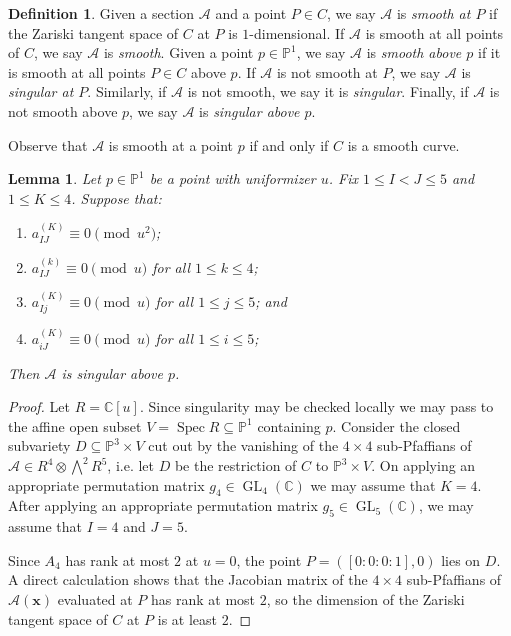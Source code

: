 \documentclass[11pt]{amsart}
\numberwithin{theorem}{section}
\numberwithin{equation}{section}
\newtheorem{lemma}[theorem]{Lemma}
\theoremstyle{definition}\newtheorem{defn}[theorem]{Definition}
\theoremstyle{definition}\newtheorem{remark}[theorem]{Remark}
\theoremstyle{definition}\newtheorem{question}[theorem]{Question}
\theoremstyle{definition}\newtheorem{problem}[theorem]{Problem}
\newcommand{\CC}{\mathbb{C}}
\newcommand{\PP}{\mathbb{P}}
\newcommand{\cA}{\mathcal{A}}
\DeclareMathOperator{\Spec}{Spec}
\DeclareMathOperator{\GL}{GL}
\renewcommand{\subset}{\subseteq}
\newcommand{\I}{I}
\newcommand{\J}{J}
\newcommand{\K}{K}
\begin{document}
\begin{defn}
\label{smooth-defn}
Given a section $\cA$ and a point $P \in C$, we say $\cA$ is \emph{smooth at $P$} if the Zariski tangent space of $C$ at $P$ is $1$-dimensional. If $\cA$ is smooth at all points of $C$, we say $\cA$ is \emph{smooth}. Given a point $p \in \PP^1$, we say $\cA$ is \emph{smooth above $p$} if it is smooth at all points $P \in C$ above $p$. If $\cA$ is not smooth at $P$, we say $\cA$ is \emph{singular at $P$}. Similarly, if $\cA$ is not smooth, we say it is \emph{singular}. Finally, if $\cA$ is not smooth above $p$, we say $\cA$ is \emph{singular above $p$}.
\end{defn}

Observe that $\cA$ is smooth at a point $p$ if and only if $C$ is a smooth curve. 

\begin{lemma}
\label{lem:singular-shape}
Let $p \in \PP^1$ be a point with uniformizer $u$. Fix $1 \leq \I < \J \leq 5$ and $1 \leq \K \leq 4$. Suppose that:
\begin{enumerate}[label=(\roman*)]
    \item $a^{(\K)}_{\I\J} \equiv 0 \pmod{u^2}$;
    \item $a^{(k)}_{\I\J} \equiv 0 \pmod{u}$ for all $1 \leq k \leq 4$; 
    \item $a^{(\K)}_{\I j} \equiv 0 \pmod{u}$ for all $1 \leq j \leq 5$; and
    \item $a^{(\K)}_{i \J} \equiv 0 \pmod{u}$ for all $1 \leq i \leq 5$;
\end{enumerate}
Then $\cA$ is singular above $p$.
\end{lemma}

\begin{proof}
  Let $R = \CC[u]$. Since singularity may be checked locally we may pass to the affine open subset $V = \Spec R \subset \PP^1$ containing $p$. Consider the closed subvariety $D \subset \PP^3 \times V$ cut out by the vanishing of the $4 \times 4$ sub-Pfaffians of $\cA \in R^4 \otimes \bigwedge^2 R^5$, i.e. let $D$ be the restriction of $C$ to $\PP^3 \times V$. On applying an appropriate permutation matrix $g_4 \in \GL_4(\CC)$ we may assume that $\K = 4$. After applying an appropriate permutation matrix $g_5 \in \GL_5(\CC)$, we may assume that $\I = 4$ and $\J = 5$.
  
  Since $A_4$ has rank at most $2$ at $u = 0$, the point $P = ([0:0:0:1], 0)$ lies on $D$. A direct calculation shows that the Jacobian matrix of the $4 \times 4$ sub-Pfaffians of $\cA(\mathbf{x})$ evaluated at $P$ has rank at most $2$, so the dimension of the Zariski tangent space of $C$ at $P$ is at least $2$.
\end{proof}
\end{document}
